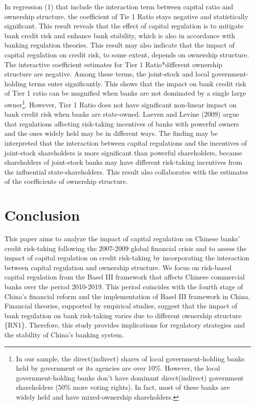 \documentclass{article}
\begin{document}
In regression (1) that include the interaction term between capital
ratio and ownership structure, the coefficient of Tie 1 Ratio stays
negative and statistically significant. This result reveals that the
effect of capital regulation is to mitigate bank credit risk and enhance
bank stability, which is also in accordance with banking regulation
theories. This result may also indicate that the impact of capital
regulation on credit risk, to some extent, depends on ownership
structure. The interactive coefficient estimates for Tier 1
Ratio*different ownership structure are negative. Among these terms, the
joint-stock and local government-holding terms enter significantly. This
shows that the impact on bank credit risk of Tier 1 ratio can be
magnified when banks are not dominated by a single large owner\footnote{In
  our sample, the direct(indirect) shares of local government-holding
  banks held by government or its agencies are over 10\%. However, the
  local government-holding banks don't have dominant direct(indirect)
  government shareholders (50\% more voting rights). In fact, most of
  these banks are widely held and have mixed-ownership shareholders.}.
However, Tier 1 Ratio does not have significant non-linear impact on
bank credit risk when banks are state-owned. Laeven and Levine (2009)
argue that regulations affecting risk-taking incentives of banks with
powerful owners and the ones widely held may be in different ways. The
finding may be interpreted that the interaction between capital
regulations and the incentives of joint-stock shareholders is more
significant than powerful shareholders, because shareholders of
joint-stock banks may have different risk-taking incentives from the
influential state-shareholders. This result also collaborates with the
estimates of the coefficients of ownership structure.

\hypertarget{conclusion}{%
\section{Conclusion}\label{conclusion}}

This paper aims to analyze the impact of capital regulation on Chinese
banks' credit risk-taking following the 2007-2009 global financial
crisis and to assess the impact of capital regulation on credit
risk-taking by incorporating the interaction between capital regulation
and ownership structure. We focus on risk-based capital regulation from
the Basel III framework that affects Chinese commercial banks over the
period 2010-2019. This period coincides with the fourth stage of China's
financial reform and the implementation of Basel III framework in China.
Financial theories, supported by empirical studies, suggest that the
impact of bank regulation on bank risk-taking varies due to different
ownership structure \{RN1\}. Therefore, this study provides implications
for regulatory strategies and the stability of China's banking system.
\end{document}
